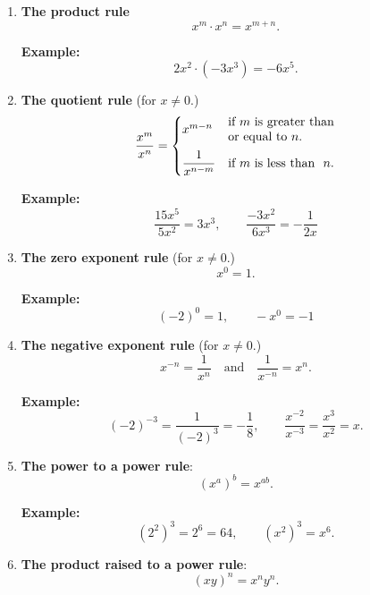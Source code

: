 	\begin{enumerate}
		\item
		      \begin{multicols}{2}
			      \textbf{The product rule}
			      \[x^m\cdot x^n=x^{m+n}.\]

			      \textbf{Example:}
			      \[2x^2\cdot (-3x^3)=-6x^5.\]
		      \end{multicols}
		\item
		      \begin{multicols}{2}
			      \textbf{The quotient rule} (for $x\neq 0$.)
			      \[
				      \dfrac{x^m}{x^n}=
				      \begin{cases}
					      x^{m-n}            & \parbox{0.25\textwidth}{if $m$ is greater than \\ or equal to $n$.}\\[1em]
					      \dfrac{1}{x^{n-m}} & \text{if~} m \text{~is less than ~} n.
				      \end{cases}
			      \]

			      \textbf{Example:}
			      \[\frac{15x^5}{5x^2}=3x^3,\quad\quad \frac{-3x^2}{6x^3}=-\frac{1}{2x}\]
		      \end{multicols}
		\item
		      \begin{multicols}{2}
			      \textbf{The zero exponent rule} (for $x\neq 0$.)
			      \[x^0=1.\]

			      \textbf{Example:}
			      \[(-2)^0=1, \quad\quad -x^0=-1\]
		      \end{multicols}
		\item
		      \begin{multicols}{2}
			      \textbf{The negative exponent rule} (for $x\neq 0$.)
			      \[x^{-n}=\dfrac{1}{x^n} \quad\text{and}\quad \dfrac{1}{x^{-n}}=x^n.\]

			      \textbf{Example:}
			      \[(-2)^{-3}=\frac{1}{(-2)^3}=-\frac18, \quad\quad \frac{x^{-2}}{x^{-3}}=\frac{x^3}{x^2}=x.\]
		      \end{multicols}
		\item
		      \begin{multicols}{2}
			      \textbf{The power to a power rule}:
			      \[\left(x^a\right)^b=x^{ab}.\]

			      \textbf{Example:}
			      \[\left(2^{2}\right)^3=2^6=64, \quad\quad \left(x^2\right)^3=x^6.\]
		      \end{multicols}
		\item
		      \begin{multicols}{2}
			      \textbf{The product raised to a power rule}:
				  \[(xy)^n=x^ny^n.\]
				  

\end{multicols}
\end{enumerate}
